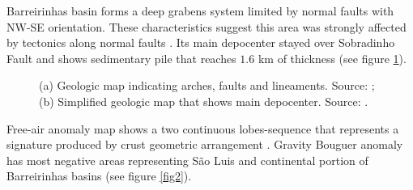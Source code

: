 \documentclass{sciposter}
\begin{document}
\begin{multicols}{3}
	Barreirinhas basin forms a deep grabens system limited by normal faults with NW-SE orientation. These characteristics suggest this area was strongly affected by tectonics along normal faults \cite{almeida2009quaternary}. Its main depocenter stayed over Sobradinho Fault and shows sedimentary pile that reaches $1.6$ km of thickness (see figure \ref{fig1}).
	
	\begin{figure}[ht!]
	\begin{center}
	\end{center}
	\caption{(a) Geologic map indicating arches, faults and lineaments. Source: \cite{soaresjunior2008evolucao}; (b) Simplified geologic map that shows main depocenter. Source: \cite{almeida2009quaternary}.}
	\label{fig1}
	\end{figure}
	
	Free-air anomaly map shows a two continuous lobes-sequence that represents a signature produced by crust geometric arrangement \cite{allen2013basin}. Gravity Bouguer anomaly has most negative areas representing São Luis and continental portion of Barreirinhas basins (see figure \ref{fig2}).
	

\end{multicols}
\end{document}
